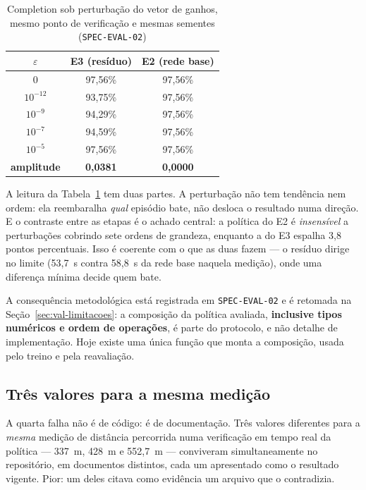 \begin{table}[h]
    \centering
    \begin{tabular}{|c|c|c|}
        \hline
        \textbf{$\varepsilon$} & \textbf{E3 (resíduo)} & \textbf{E2 (rede base)} \\
        \hline
        0          & 97,56\%         & 97,56\%         \\
        \hline
        $10^{-12}$ & 93,75\%         & 97,56\%         \\
        \hline
        $10^{-9}$  & 94,29\%         & 97,56\%         \\
        \hline
        $10^{-7}$  & 94,59\%         & 97,56\%         \\
        \hline
        $10^{-5}$  & 97,56\%         & 97,56\%         \\
        \hline
        \textbf{amplitude} & \textbf{0,0381} & \textbf{0,0000} \\
        \hline
    \end{tabular}
    \caption{Completion sob perturbação do vetor de ganhos, mesmo ponto de
    verificação e mesmas sementes (\texttt{SPEC-EVAL-02})}
    \label{tab:val_sensibilidade}
\end{table}

A leitura da Tabela~\ref{tab:val_sensibilidade} tem duas partes. A perturbação
não tem tendência nem ordem: ela reembaralha \textit{qual} episódio bate, não
desloca o resultado numa direção. E o contraste entre as etapas é o achado
central: a política do E2 é \textit{insensível} a perturbações cobrindo sete
ordens de grandeza, enquanto a do E3 espalha 3,8 pontos percentuais. Isso é
coerente com o que as duas fazem --- o resíduo dirige no limite (53,7~s contra
58,8~s da rede base naquela medição), onde uma diferença mínima decide quem bate.

A consequência metodológica está registrada em \texttt{SPEC-EVAL-02} e é
retomada na Seção~\ref{sec:val-limitacoes}: a composição da política avaliada,
\textbf{inclusive tipos numéricos e ordem de operações}, é parte do protocolo, e
não detalhe de implementação. Hoje existe uma única função que monta a
composição, usada pelo treino e pela reavaliação.

\subsection{Três valores para a mesma medição}

A quarta falha não é de código: é de documentação. Três valores diferentes para
a \textit{mesma} medição de distância percorrida numa verificação em tempo real da política ---
337~m, 428~m e 552,7~m --- conviveram simultaneamente no repositório, em
documentos distintos, cada um apresentado como o resultado vigente. Pior: um
deles citava como evidência um arquivo que o contradizia.

